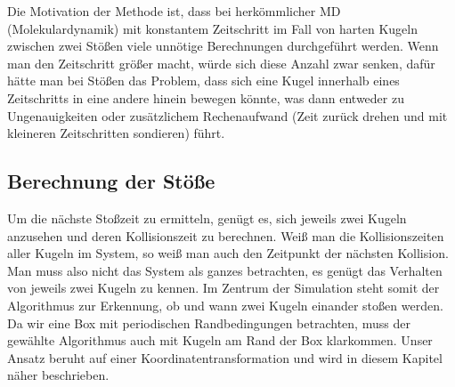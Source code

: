 
Die Motivation der Methode ist, dass bei herkömmlicher MD (Molekulardynamik) mit konstantem Zeitschritt im Fall von harten Kugeln zwischen zwei Stößen viele unnötige Berechnungen durchgeführt werden. Wenn man den Zeitschritt größer macht, würde sich diese Anzahl zwar senken, dafür hätte man bei Stößen das Problem, dass sich eine Kugel innerhalb eines Zeitschritts in eine andere hinein bewegen könnte, was dann entweder zu Ungenauigkeiten oder zusätzlichem Rechenaufwand (Zeit zurück drehen und mit kleineren Zeitschritten sondieren) führt.

\subsection{Berechnung der Stöße}
\newcommand{\reffig}[1]{Abbildung \ref{fig:#1}}

Um die nächste Stoßzeit zu ermitteln, genügt es, sich jeweils zwei Kugeln anzusehen und deren Kollisionszeit zu berechnen. Weiß man die Kollisionszeiten aller Kugeln im System, so weiß man auch den Zeitpunkt der nächsten Kollision. Man muss also nicht das System als ganzes betrachten, es genügt das Verhalten von jeweils zwei Kugeln zu kennen.
Im Zentrum der Simulation steht somit der Algorithmus zur Erkennung, ob und wann zwei Kugeln einander stoßen werden. 
Da wir eine Box mit periodischen Randbedingungen betrachten, muss der gewählte Algorithmus auch mit Kugeln am Rand der Box klarkommen. Unser Ansatz beruht auf einer Koordinatentransformation und wird in diesem Kapitel näher beschrieben.





